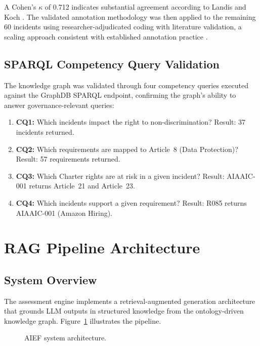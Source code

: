 A Cohen's $\kappa$ of 0.712 indicates substantial agreement according to Landis and Koch \cite{landiskoch1977}. The validated annotation methodology was then applied to the remaining 60 incidents using researcher-adjudicated coding with literature validation, a scaling approach consistent with established annotation practice \cite{pustejovsky2012}.


\subsection{SPARQL Competency Query Validation}

The knowledge graph was validated through four competency queries executed against the GraphDB SPARQL endpoint, confirming the graph's ability to answer governance-relevant queries:

\begin{enumerate}
\item \textbf{CQ1:} Which incidents impact the right to non-discrimination? Result: 37 incidents returned.
\item \textbf{CQ2:} Which requirements are mapped to Article~8 (Data Protection)? Result: 57 requirements returned.
\item \textbf{CQ3:} Which Charter rights are at risk in a given incident? Result: AIAAIC-001 returns Article~21 and Article~23.
\item \textbf{CQ4:} Which incidents support a given requirement? Result: R085 returns AIAAIC-001 (Amazon Hiring).
\end{enumerate}


\section{RAG Pipeline Architecture}
\label{sec:rag}

\subsection{System Overview}

The assessment engine implements a retrieval-augmented generation architecture that grounds LLM outputs in structured knowledge from the ontology-driven knowledge graph. Figure~\ref{fig:architecture} illustrates the pipeline.

\begin{figure}[htbp]
\centering
{}
\caption{AIEF system architecture.}
\label{fig:architecture}
\end{figure}

